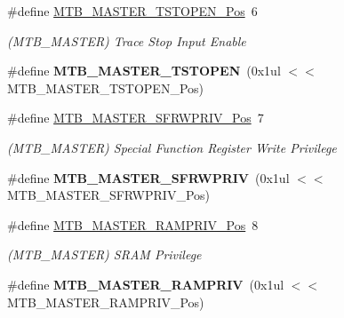\begin{DoxyCompactItemize}
\item 
\hypertarget{group___s_a_m_l21___m_t_b_ga537be1d3321b4266e5ef48b785a4668f}{}\#define \hyperlink{group___s_a_m_l21___m_t_b_ga537be1d3321b4266e5ef48b785a4668f}{M\+T\+B\+\_\+\+M\+A\+S\+T\+E\+R\+\_\+\+T\+S\+T\+O\+P\+E\+N\+\_\+\+Pos}~6\label{group___s_a_m_l21___m_t_b_ga537be1d3321b4266e5ef48b785a4668f}

\begin{DoxyCompactList}\small\item\em (M\+T\+B\+\_\+\+M\+A\+S\+T\+E\+R) Trace Stop Input Enable \end{DoxyCompactList}\item 
\hypertarget{group___s_a_m_l21___m_t_b_gac7aa980eeecbf5544fea667b1f2f183a}{}\#define {\bfseries M\+T\+B\+\_\+\+M\+A\+S\+T\+E\+R\+\_\+\+T\+S\+T\+O\+P\+E\+N}~(0x1ul $<$$<$ M\+T\+B\+\_\+\+M\+A\+S\+T\+E\+R\+\_\+\+T\+S\+T\+O\+P\+E\+N\+\_\+\+Pos)\label{group___s_a_m_l21___m_t_b_gac7aa980eeecbf5544fea667b1f2f183a}

\item 
\hypertarget{group___s_a_m_l21___m_t_b_ga5a86f212f89ce854b43eb935c6441208}{}\#define \hyperlink{group___s_a_m_l21___m_t_b_ga5a86f212f89ce854b43eb935c6441208}{M\+T\+B\+\_\+\+M\+A\+S\+T\+E\+R\+\_\+\+S\+F\+R\+W\+P\+R\+I\+V\+\_\+\+Pos}~7\label{group___s_a_m_l21___m_t_b_ga5a86f212f89ce854b43eb935c6441208}

\begin{DoxyCompactList}\small\item\em (M\+T\+B\+\_\+\+M\+A\+S\+T\+E\+R) Special Function Register Write Privilege \end{DoxyCompactList}\item 
\hypertarget{group___s_a_m_l21___m_t_b_ga632ffa908823ac480375ac19d3cb5250}{}\#define {\bfseries M\+T\+B\+\_\+\+M\+A\+S\+T\+E\+R\+\_\+\+S\+F\+R\+W\+P\+R\+I\+V}~(0x1ul $<$$<$ M\+T\+B\+\_\+\+M\+A\+S\+T\+E\+R\+\_\+\+S\+F\+R\+W\+P\+R\+I\+V\+\_\+\+Pos)\label{group___s_a_m_l21___m_t_b_ga632ffa908823ac480375ac19d3cb5250}

\item 
\hypertarget{group___s_a_m_l21___m_t_b_ga00ba898e29ce885b476cec508780fdf9}{}\#define \hyperlink{group___s_a_m_l21___m_t_b_ga00ba898e29ce885b476cec508780fdf9}{M\+T\+B\+\_\+\+M\+A\+S\+T\+E\+R\+\_\+\+R\+A\+M\+P\+R\+I\+V\+\_\+\+Pos}~8\label{group___s_a_m_l21___m_t_b_ga00ba898e29ce885b476cec508780fdf9}

\begin{DoxyCompactList}\small\item\em (M\+T\+B\+\_\+\+M\+A\+S\+T\+E\+R) S\+R\+A\+M Privilege \end{DoxyCompactList}\item 
\hypertarget{group___s_a_m_l21___m_t_b_ga578ef21836ea1ee0a56f0af70d22ce97}{}\#define {\bfseries M\+T\+B\+\_\+\+M\+A\+S\+T\+E\+R\+\_\+\+R\+A\+M\+P\+R\+I\+V}~(0x1ul $<$$<$ M\+T\+B\+\_\+\+M\+A\+S\+T\+E\+R\+\_\+\+R\+A\+M\+P\+R\+I\+V\+\_\+\+Pos)\label{group___s_a_m_l21___m_t_b_ga578ef21836ea1ee0a56f0af70d22ce97}


\end{DoxyCompactItemize}
